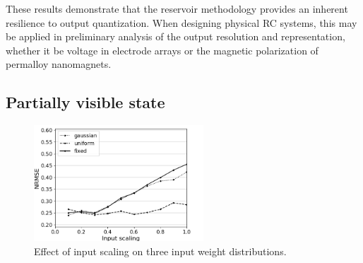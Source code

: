 These results demonstrate that the reservoir methodology provides an inherent
resilience to output quantization. When designing physical RC systems, this may
be applied in preliminary analysis of the output resolution and representation,
whether it be voltage in electrode arrays or the magnetic polarization of
permalloy nanomagnets.



\subsection{Partially visible state}

\begin{figure}[H]
  \centering
  \includegraphics[width=2.5in]{img/input_scaling_distrib.png}
  \caption{
    Effect of input scaling on three input weight distributions.
  }
  \label{input_scaling_distrib}
\end{figure}

